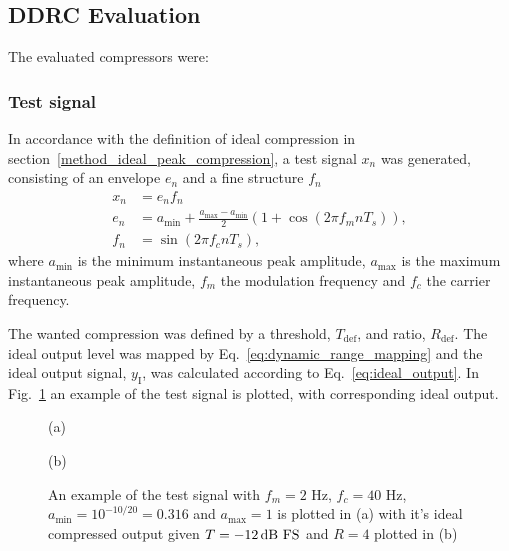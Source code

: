 \documentclass[../main2.tex]{subfiles}
\providecommand{\rootdir}{..}
\begin{document}
\subsection{DDRC Evaluation}\label{method_peak_compressors}
The evaluated compressors were:



\subsubsection{Test signal}\label{method_test_signal}
In accordance with the definition of ideal compression in section~\ref{method_ideal_peak_compression}, a test signal $x_n$ was generated, consisting of an envelope $e_n$ and a fine structure $f_n$
\begin{equation}
\begin{split}
	x_n &=e_nf_n\\
	e_n &= a_\text{min} + \frac{a_\text{max}- a_\text{min}}{2} \left(1 + \cos(2 \pi f_m n T_s) \right), \\
	f_n &= \sin(2 \pi f_c n T_s),
\end{split} \label{eq:test_signal}
\end{equation}
where $a_\text{min}$ is the minimum instantaneous peak amplitude, $a_\text{max}$ is the maximum instantaneous peak amplitude, $f_m$ the modulation frequency and $f_c$ the carrier frequency.

The wanted compression was defined by a threshold, $T_\text{def}$, and ratio, $R_\text{def}$. The ideal output level was mapped by Eq.~\eqref{eq:dynamic_range_mapping} and the ideal output signal, $y_\text{I}$, was calculated according to Eq.~\eqref{eq:ideal_output}. In Fig.~\ref{fig:testsignal} an example of the test signal is plotted, with corresponding ideal output.
\begin{figure}[ht]
\captionsetup*{justification=centering}
\begin{minipage}[t]{.5\textwidth}
 \centering

\caption*{(a)} 
\label{fig:param_opt_left}
\end{minipage}%
\begin{minipage}[t]{.5\textwidth}
\centering

\caption*{(b)} 
\label{fig:param_opt_right}
\end{minipage}
\caption{An example of the test signal with $f_m=2$ Hz, $f_c= 40$ Hz, $a_\text{min} = 10^{-10/20}=0.316$ and $a_\text{max} = 1$ is plotted in (a) with it's ideal compressed output given $T=-12 \mskip3mu\text{dB~FS}$ and $R = 4$ plotted in (b)}
\label{fig:testsignal}
\end{figure}
\end{document}
